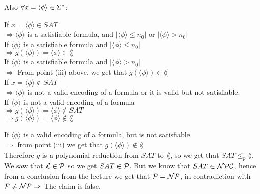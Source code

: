 Also $\forall x=\langle \phi \rangle \in \Sigma^*$:

If $x=\langle \phi \rangle \in SAT$ \\
$\Longrightarrow \langle \phi \rangle$ is a satisfiable formula, and $|\langle \phi \rangle \leq n_0|$ or $|\langle \phi \rangle > n_0|$ \\
If $\langle \phi \rangle$ is a satisfiable formula and $|\langle \phi \rangle \leq n_0|$ \\
$\Longrightarrow g(\langle \phi \rangle) = \langle \phi \rangle \in \lang$ \\
If $\langle \phi \rangle$ is a satisfiable formula and $|\langle \phi \rangle > n_0|$ \\
$\Longrightarrow$ From point (iii) above, we get that $g(\langle \phi \rangle) \in \lang$ \\

If $x=\langle \phi \rangle \notin SAT$ \\
$\Longrightarrow \langle \phi \rangle$ is not a valid encoding of a formula or it is valid but not satisfiable. \\
If $\langle \phi \rangle$ is not a valid encoding of a formula \\
$\Longrightarrow g(\langle \phi \rangle) = \langle \phi \rangle \notin SAT$ \\
$\Longrightarrow g(\langle \phi \rangle) = \langle \phi \rangle \notin \lang$

If $\langle \phi \rangle$ is a valid encoding of a formula, but is not satisfiable \\
$\Longrightarrow $ from point (iii) we get that $g(\langle \phi \rangle) \notin \lang$ \\

Therefore $g$ is a polynomial reduction from $SAT$ to $\lang$, so we get that $SAT \leq_p \lang$. We saw that $\mathcal{L} \in \mathcal{P}$ so we get $SAT \in \mathcal{P}$.
But we know that $SAT \in \mathcal{N}\mathcal{P}\mathcal{C}$, hence from a conclusion from the lecture we get that $\mathcal{P} = \mathcal{N}\mathcal{P}$, in contradiction with $\mathcal{P} \neq \mathcal{N}\mathcal{P} \Rightarrow$ The claim is false.

